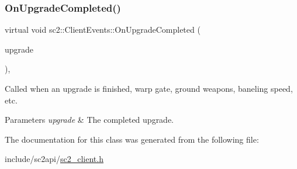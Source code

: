 \subsubsection{\texorpdfstring{On\+Upgrade\+Completed()}{OnUpgradeCompleted()}}
{\footnotesize\ttfamily virtual void sc2\+::\+Client\+Events\+::\+On\+Upgrade\+Completed (\begin{DoxyParamCaption}\item[{\hyperlink{classsc2_1_1_s_c2_type}{Upgrade\+ID}}]{upgrade }\end{DoxyParamCaption})\hspace{0.3cm}{\ttfamily [inline]}, {\ttfamily [virtual]}}

Called when an upgrade is finished, warp gate, ground weapons, baneling speed, etc. 
\begin{DoxyParams}{Parameters}
{\em upgrade} & The completed upgrade. \\
\hline
\end{DoxyParams}


The documentation for this class was generated from the following file\+:\begin{DoxyCompactItemize}
\item 
include/sc2api/\hyperlink{sc2__client_8h}{sc2\+\_\+client.\+h}\end{DoxyCompactItemize}
